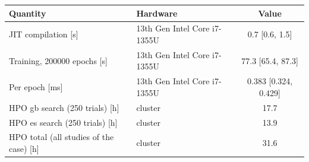 \begin{tabular}{llc}
\toprule
Quantity & Hardware & Value \\
\midrule
JIT compilation [s] & 13th Gen Intel Core i7-1355U & \num{0.7} [\num{0.6}, \num{1.5}] \\
Training, \num{200000} epochs [s] & 13th Gen Intel Core i7-1355U & \num{77.3} [\num{65.4}, \num{87.3}] \\
Per epoch [ms] & 13th Gen Intel Core i7-1355U & \num{0.383} [\num{0.324}, \num{0.429}] \\
HPO gb search (250 trials) [h] & cluster & \num{17.7} \\
HPO es search (250 trials) [h] & cluster & \num{13.9} \\
HPO total (all studies of the case) [h] & cluster & \num{31.6} \\
\bottomrule
\end{tabular}
